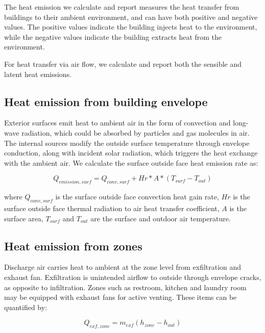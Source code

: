 The heat emission we calculate and report measures the heat transfer from buildings to their ambient environment, and can have both positive and negative values. The positive values indicate the building injects heat to the environment, while the negative values indicate the building extracts heat from the environment.

For heat transfer via air flow, we calculate and report both the sensible and latent heat emissions.

\subsection{Heat emission from building envelope}\label{emission-from-envelope}

Exterior surfaces emit heat to ambient air in the form of convection and long-wave radiation, which could be absorbed by particles and gas molecules in air. The internal sources modify the outside surface temperature through envelope conduction, along with incident solar radiation, which triggers the heat exchange with the ambient air. We calculate the surface outside face heat emission rate  as:

\begin{equation}  \label{eq:he-1}
Q_{emission, surf} = Q_{conv, surf} +  Hr * A * (T_{surf} - T_{out})
\end{equation}

where \(Q_{conv, surf}\) is the surface outside face convection heat gain rate, \(Hr\) is the surface outside face thermal radiation to air heat transfer coefficient, \(A\) is the surface area, \(T_{surf}\) and \(T_{out}\) are the surface and outdoor air temperature.

\subsection{Heat emission from zones}\label{emission-from-zones}

Discharge air carries heat to ambient at the zone level from exfiltration and exhaust fan. Exfiltration is unintended airflow to outside through envelope cracks, as opposite to infiltration. Zones such as restroom, kitchen and laundry room may be equipped with exhaust fans for active venting. These items can be quantified by:

\begin{equation}  \label{eq:he-2}
Q_{exf, zone} = m_{exf}(h_{zone} - h_{out})
\end{equation}

